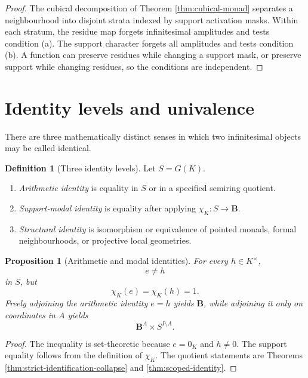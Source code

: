 \documentclass[11pt]{amsart}
\numberwithin{equation}{section}
\newtheorem{proposition}[theorem]{Proposition}
\theoremstyle{definition}
\newtheorem{definition}[theorem]{Definition}
\newcommand{\B}{\mathbf B}
\begin{document}
\begin{proof}
The cubical decomposition of Theorem \ref{thm:cubical-monad} separates a neighbourhood into disjoint strata indexed by support activation masks.  Within each stratum, the residue map forgets infinitesimal amplitudes and tests condition (a).  The support character forgets all amplitudes and tests condition (b).  A function can preserve residues while changing a support mask, or preserve support while changing residues, so the conditions are independent.
\end{proof}

\section{Identity levels and univalence}

There are three mathematically distinct senses in which two infinitesimal objects may be called identical.

\begin{definition}[Three identity levels]\label{def:identity-levels}
Let $S=G(K)$.
\begin{enumerate}[label=\textup{(\roman*)}]
\item \emph{Arithmetic identity} is equality in $S$ or in a specified semiring quotient.
\item \emph{Support-modal identity} is equality after applying $\chi_K:S\to\B$.
\item \emph{Structural identity} is isomorphism or equivalence of pointed monads, formal neighbourhoods, or projective local geometries.
\end{enumerate}
\end{definition}

\begin{proposition}[Arithmetic and modal identities]\label{prop:arithmetic-modal}
For every $h\in K^\times$,
\[
e\neq h
\]
in $S$, but
\[
\chi_K(e)=\chi_K(h)=1.
\]
Freely adjoining the arithmetic identity $e=h$ yields $\B$, while adjoining it only on coordinates in $A$ yields
\[
\B^A\times S^{I\setminus A}.
\]
\end{proposition}

\begin{proof}
The inequality is set-theoretic because $e=0_K$ and $h\neq0$.  The support equality follows from the definition of $\chi_K$.  The quotient statements are Theorems \ref{thm:strict-identification-collapse} and \ref{thm:scoped-identity}.
\end{proof}
\end{document}
